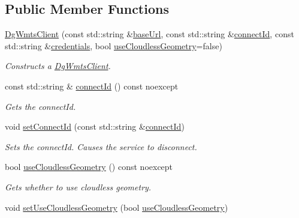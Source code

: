 \subsection*{Public Member Functions}
\begin{DoxyCompactItemize}
\item 
\hyperlink{classdg_1_1deepcore_1_1imagery_1_1_dg_wmts_client_a080a9c2664a66bccee9b36ffd411085c}{Dg\+Wmts\+Client} (const std\+::string \&\hyperlink{group___imagery_module_gadf279770cec6dc9ac56348bb2e1b29e1}{base\+Url}, const std\+::string \&\hyperlink{classdg_1_1deepcore_1_1imagery_1_1_dg_wmts_client_aaa23928355c68c5422a5aab297d64f99}{connect\+Id}, const std\+::string \&\hyperlink{group___imagery_module_gac4c03ea635c336ca2fe7de533706c11c}{credentials}, bool \hyperlink{classdg_1_1deepcore_1_1imagery_1_1_dg_wmts_client_a718ef987832eb1d5bbab510c6ef7b70c}{use\+Cloudless\+Geometry}=false)
\begin{DoxyCompactList}\small\item\em Constructs a \hyperlink{classdg_1_1deepcore_1_1imagery_1_1_dg_wmts_client}{Dg\+Wmts\+Client}. \end{DoxyCompactList}\item 
const std\+::string \& \hyperlink{classdg_1_1deepcore_1_1imagery_1_1_dg_wmts_client_aaa23928355c68c5422a5aab297d64f99}{connect\+Id} () const noexcept
\begin{DoxyCompactList}\small\item\em Gets the connect\+Id. \end{DoxyCompactList}\item 
void \hyperlink{classdg_1_1deepcore_1_1imagery_1_1_dg_wmts_client_aa7e7d9c316fc59ccbe6a30596389a3da}{set\+Connect\+Id} (const std\+::string \&\hyperlink{classdg_1_1deepcore_1_1imagery_1_1_dg_wmts_client_aaa23928355c68c5422a5aab297d64f99}{connect\+Id})
\begin{DoxyCompactList}\small\item\em Sets the connect\+Id. Causes the service to disconnect. \end{DoxyCompactList}\item 
bool \hyperlink{classdg_1_1deepcore_1_1imagery_1_1_dg_wmts_client_a718ef987832eb1d5bbab510c6ef7b70c}{use\+Cloudless\+Geometry} () const noexcept
\begin{DoxyCompactList}\small\item\em Gets whether to use cloudless geometry. \end{DoxyCompactList}\item 
void \hyperlink{classdg_1_1deepcore_1_1imagery_1_1_dg_wmts_client_ab517b9f4668bc619e790455cd5111cff}{set\+Use\+Cloudless\+Geometry} (bool \hyperlink{classdg_1_1deepcore_1_1imagery_1_1_dg_wmts_client_a718ef987832eb1d5bbab510c6ef7b70c}{use\+Cloudless\+Geometry})

\end{DoxyCompactItemize}
